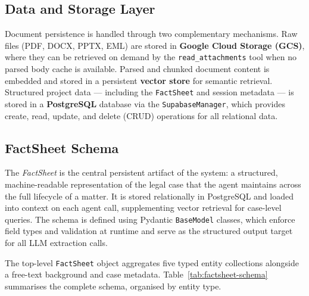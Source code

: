 \subsection{Data and Storage Layer}

Document persistence is handled through two complementary mechanisms. Raw files (PDF, DOCX, PPTX, EML) are stored in \textbf{Google Cloud Storage (GCS)}, where they can be retrieved on demand by the \texttt{read\_attachments} tool when no parsed body cache is available. Parsed and chunked document content is embedded and stored in a persistent \textbf{vector store} for semantic retrieval. Structured project data — including the \texttt{FactSheet} and session metadata — is stored in a \textbf{PostgreSQL} database via the \texttt{SupabaseManager}, which provides create, read, update, and delete (CRUD) operations for all relational data.

\subsection{FactSheet Schema}
\label{sec:factsheet-schema}

The \textit{FactSheet} is the central persistent artifact of the system: a structured, machine-readable representation of the legal case that the agent maintains across the full lifecycle of a matter. It is stored relationally in PostgreSQL and loaded into context on each agent call, supplementing vector retrieval for case-level queries. The schema is defined using Pydantic \texttt{BaseModel} classes, which enforce field types and validation at runtime and serve as the structured output target for all LLM extraction calls.

The top-level \texttt{FactSheet} object aggregates five typed entity collections alongside a free-text background and case metadata. Table~\ref{tab:factsheet-schema} summarises the complete schema, organised by entity type.

